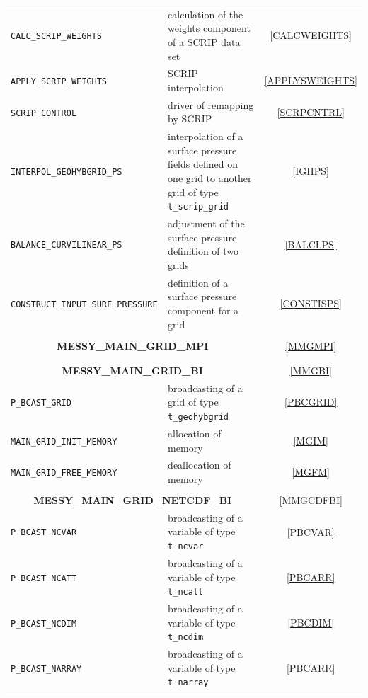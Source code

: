 \documentclass[11pt,twoside]{article}
\begin{document}
\begin{longtable}{|p{5cm}p{8.5cm}c|}
\color{blue} \tt {CALC\_SCRIP\_WEIGHTS} & calculation of the weights
component of a SCRIP data set & \ref{CALCWEIGHTS}\\  
\color{blue} \tt {APPLY\_SCRIP\_WEIGHTS} & SCRIP interpolation & \ref{APPLYSWEIGHTS}\\  
\color{blue} \tt {SCRIP\_CONTROL} & driver of remapping by SCRIP & \ref{SCRPCNTRL}\\  
\color{blue} \tt {INTERPOL\_GEOHYBGRID\_PS} &  interpolation of a surface
pressure fields defined on one grid to another grid of type \verb|t_scrip_grid|  & \ref{IGHPS}\\  
\color{blue} \tt {BALANCE\_CURVILINEAR\_PS} &  adjustment of the
surface pressure definition of two grids & \ref{BALCLPS}\\  
\color{blue} \tt {\small CONSTRUCT\_INPUT\_SURF\_PRESSURE} & definition of a
surface pressure component for a grid & \ref{CONSTISPS}\\  
 & & \\ 
\multicolumn{2}{|c}{\bf \large
 MESSY\_MAIN\_GRID\_MPI}& \ref{MMGMPI}\\ \hline
 & & \\ \hline 
 & & \\ 
\multicolumn{2}{|c}{\bf \large MESSY\_MAIN\_GRID\_BI}& \ref{MMGBI}\\ \hline 
\color{blue} \tt {P\_BCAST\_GRID} &  broadcasting of a grid of
type \verb|t_geohybgrid| & \ref{PBCGRID}\\  
\color{blue} \tt {MAIN\_GRID\_INIT\_MEMORY} & allocation of memory & \ref{MGIM}\\  
\color{blue} \tt {MAIN\_GRID\_FREE\_MEMORY} & deallocation of memory & \ref{MGFM}\\  
 & & \\ 
\multicolumn{2}{|c}{\bf \large MESSY\_MAIN\_GRID\_NETCDF\_BI}& \ref{MMGCDFBI}\\ \hline 
\color{blue} \tt {P\_BCAST\_NCVAR} & broadcasting of a variable of type \verb|t_ncvar| & \ref{PBCVAR}\\  
\color{blue} \tt {P\_BCAST\_NCATT} & broadcasting of a variable of type \verb|t_ncatt| & \ref{PBCARR}\\  
\color{blue} \tt {P\_BCAST\_NCDIM} & broadcasting of a variable of type \verb|t_ncdim| & \ref{PBCDIM}\\  
\color{blue} \tt {P\_BCAST\_NARRAY} & broadcasting of a variable of type \verb|t_narray| & \ref{PBCARR}\\  
\end{longtable}
\vspace*{0.5cm}
\end{document}

